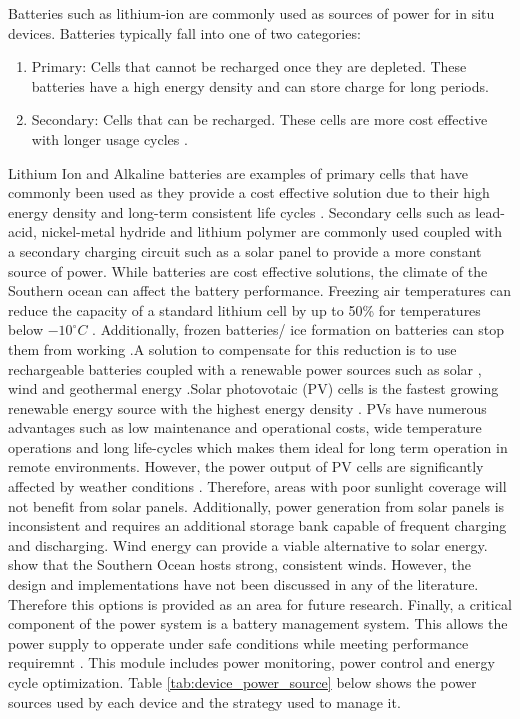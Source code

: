 Batteries such as lithium-ion are commonly used as sources of power for in situ devices. Batteries typically fall into one of two categories:
\begin{enumerate}
	\item Primary: Cells that cannot be recharged once they are depleted. These batteries have a high energy density and can store charge for long periods.\cite{besenhard2008handbook}
	\item Secondary: Cells that can be recharged. These cells are more cost effective with longer usage cycles \cite{besenhard2008handbook}.
\end{enumerate}

Lithium  Ion and Alkaline batteries are examples of primary cells that have commonly been used as they provide a cost effective solution due to their high energy density and long-term consistent life cycles \cite{zareer2018review}.  Secondary cells such as lead-acid, nickel-metal hydride and lithium polymer are commonly used coupled with a secondary charging circuit such as a solar panel \cite{manimekalai2013overview} to provide a more constant source of power. While batteries are cost effective solutions, the climate of the Southern ocean can affect the battery performance. Freezing air temperatures can reduce the capacity of a standard lithium cell by up to 50\% for temperatures below $-10^\circ C$ \cite{doble2017robust,ZHANG2003137}. Additionally, frozen batteries/ ice formation on batteries can stop them from working \cite{doble2017robust,manimekalai2013overview}.A solution to compensate for this reduction is to use rechargeable batteries coupled with a renewable power sources such as solar \cite{doble2017robust,rabault2019open}, wind and geothermal energy \cite{manimekalai2013overview}.Solar photovotaic (PV) cells is the fastest growing renewable energy source with the highest energy density \cite{jordehi2016parameter}. PVs have numerous advantages such as low maintenance and operational costs, wide temperature operations and long life-cycles \cite{jordehi2016parameter} which makes them ideal for long term operation in remote environments. However, the power output of PV cells are significantly affected by weather conditions \cite{sharma2015solar}. Therefore, areas with poor sunlight coverage will not benefit from solar panels. Additionally, power generation from solar panels is inconsistent and requires an additional storage bank capable of frequent charging and discharging. Wind energy can provide a viable alternative to solar energy. \textcite{vichi2019effects} show that the Southern Ocean hosts strong, consistent winds. However, the design and implementations have not been discussed in any of the literature. Therefore this options is provided as an area for future research. Finally, a critical component of the power system is a battery management system. This allows the power supply to opperate under safe conditions while meeting performance requiremnt \cite{vidal2019xev}. This module includes power monitoring, power control and energy cycle optimization. Table \ref{tab:device_power_source} below shows the power sources used by each device and the strategy used to manage it.
